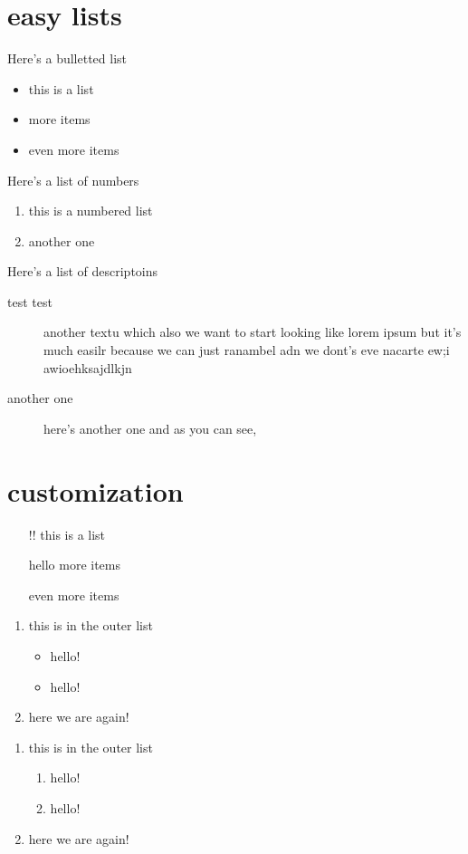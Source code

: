 \documentclass[12pt]{report}
\begin{document}
\section{easy lists}

Here's a bulletted list 
\begin{itemize}
\item this is a list 
\item more items 
\item even more items 
\end{itemize}

Here's a list of numbers 
\begin{enumerate}
\item this is a numbered list
\item another one 
\end{enumerate}

Here's a list of descriptoins 
\begin{description}
\item[test test] another textu which also we want to start looking like lorem ipsum but it's much easilr because we can just ranambel adn we dont's eve nacarte ew;i awioehksajdlkjn  
\item[another one] here's another one and as you can see, 
\end{description} 

\section{customization}
\begin{itemize}
\item[!!] this is a list 
\item[hello] more items 
\item[] even more items 
\end{itemize}

\begin{enumerate}
\item this is in the outer list  
    \begin{itemize}
    \item hello!
    \item hello! 
    \end{itemize}
\item here we are again! 
\end{enumerate}

\begin{enumerate}
\item this is in the outer list  
    \begin{enumerate}
    \item hello!
    \item hello! 
    \end{enumerate}
\item here we are again! 
\end{enumerate}
\end{document}

